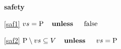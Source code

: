\textbf{safety}
\begin{block}
\item[ \eqref{saf1} ]$vs = \text{P} \textbf{\quad unless \quad} \text{false}$ %
\item[ \eqref{saf2} ]$\text{P} \setminus vs \subseteq V \textbf{\quad unless \quad} vs = \text{P}$ %
\end{block}
